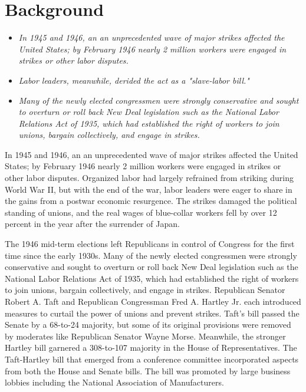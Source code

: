\section{Background}\label{background}

\begin{itemize}
\item
  \emph{In 1945 and 1946, an an unprecedented wave of major strikes
  affected the United States; by February 1946 nearly 2 million workers
  were engaged in strikes or other labor disputes.}
\item
  \emph{Labor leaders, meanwhile, derided the act as a "slave-labor
  bill."}
\item
  \emph{Many of the newly elected congressmen were strongly conservative
  and sought to overturn or roll back New Deal legislation such as the
  National Labor Relations Act of 1935, which had established the right
  of workers to join unions, bargain collectively, and engage in
  strikes.}
\end{itemize}

In 1945 and 1946, an an unprecedented wave of major strikes affected the
United States; by February 1946 nearly 2 million workers were engaged in
strikes or other labor disputes. Organized labor had largely refrained
from striking during World War II, but with the end of the war, labor
leaders were eager to share in the gains from a postwar economic
resurgence. The strikes damaged the political standing of unions, and
the real wages of blue-collar workers fell by over 12 percent in the
year after the surrender of Japan.

The 1946 mid-term elections left Republicans in control of Congress for
the first time since the early 1930s. Many of the newly elected
congressmen were strongly conservative and sought to overturn or roll
back New Deal legislation such as the National Labor Relations Act of
1935, which had established the right of workers to join unions, bargain
collectively, and engage in strikes. Republican Senator Robert A. Taft
and Republican Congressman Fred A. Hartley Jr. each introduced measures
to curtail the power of unions and prevent strikes. Taft's bill passed
the Senate by a 68-to-24 majority, but some of its original provisions
were removed by moderates like Republican Senator Wayne Morse.
Meanwhile, the stronger Hartley bill garnered a 308-to-107 majority in
the House of Representatives. The Taft-Hartley bill that emerged from a
conference committee incorporated aspects from both the House and Senate
bills. The bill was promoted by large business lobbies including the
National Association of Manufacturers.

